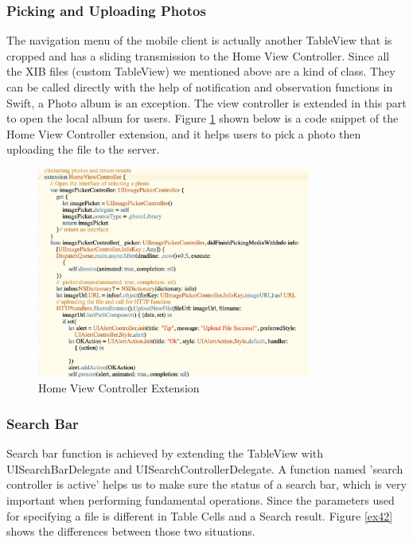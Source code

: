 \documentclass{article}
\begin{document}
\subsubsection{Picking and Uploading Photos}

The navigation menu of the mobile client is actually another TableView that is cropped and has a sliding transmission to the Home View Controller. Since all the XIB files (custom TableView) we mentioned above are a kind of class. They can be called directly with the help of notification and observation functions in Swift, a Photo album is an exception. The view controller is extended in this part to open the local album for users. Figure \ref{ex41} shown below is a code snippet of the Home View Controller extension, and it helps users to pick a photo then uploading the file to the server. 

\begin{figure}[H]
\begin{center}
\includegraphics[width=9cm]{33.png}
\end{center}
\caption{Home View Controller Extension}\label{ex41}
\end{figure}
 
\subsubsection{Search Bar}

Search bar function is achieved by extending the TableView with UISearchBarDelegate and UISearchControllerDelegate. A function named 'search controller is active' helps us to make sure the status of a search bar, which is very important when performing fundamental operations. Since the parameters used for specifying a file is different in Table Cells and a Search result. Figure \ref{ex42} shows the differences between those two situations.
\end{document}
